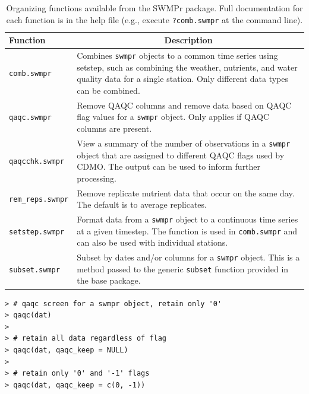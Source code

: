 \documentclass[10pt,letterpaper]{article}\usepackage[]{graphicx}\usepackage[]{color}
\makeatletter
\newenvironment{kframe}{%
 \def\at@end@of@kframe{}%
 \ifinner\ifhmode%
  \def\at@end@of@kframe{\end{minipage}}%
  \begin{minipage}{\columnwidth}%
 \fi\fi%
 \def\FrameCommand##1{\hskip\@totalleftmargin \hskip-\fboxsep
 \colorbox{shadecolor}{##1}\hskip-\fboxsep
     \hskip-\linewidth \hskip-\@totalleftmargin \hskip\columnwidth}%
 \MakeFramed {\advance\hsize-\width
   \@totalleftmargin\z@ \linewidth\hsize
   \@setminipage}}%
 {\par\unskip\endMakeFramed%
 \at@end@of@kframe}
\newenvironment{knitrout}{}{} %
\makeatother
\begin{document}
\begin{table}[!tbp]
\caption{Organizing functions available from the SWMPr package. Full documentation for each function is in the help file (e.g., execute \texttt{?comb.swmpr} at the command line).\label{tab:organize}} 
\begin{center}
\begin{tabular}{lp{3.5in}}
\hline\hline
\multicolumn{1}{l}{Function}&\multicolumn{1}{c}{Description}\tabularnewline
\hline
\texttt{comb.swmpr}&Combines \texttt{swmpr} objects to a common time series using setstep, such as combining the weather, nutrients, and water quality data for a single station. Only different data types can be combined.\tabularnewline
\texttt{qaqc.swmpr}&Remove \ac{QAQC} columns and remove data based on \ac{QAQC} flag values for a \texttt{swmpr} object.  Only applies if \ac{QAQC} columns are present. \tabularnewline
\texttt{qaqcchk.swmpr}&View a summary of the number of observations in a \texttt{swmpr} object that are assigned to different \ac{QAQC} flags used by \ac{CDMO}.  The output can be used to inform further processing.\tabularnewline
\texttt{rem\_reps.swmpr}&Remove replicate nutrient data that occur on the same day.  The default is to average replicates.\tabularnewline
\texttt{setstep.swmpr}&Format data from a \texttt{swmpr} object to a continuous time series at a given timestep.  The function is used in \texttt{comb.swmpr} and can also be used with individual stations.\tabularnewline
\texttt{subset.swmpr}&Subset by dates and/or columns for a \texttt{swmpr} object.  This is a method passed to the generic \texttt{subset} function provided in the base package.\tabularnewline
\hline
\end{tabular}\end{center}

\end{table}


\begin{knitrout}\small
{}\color{fgcolor}\begin{kframe}
\begin{verbatim}
> # qaqc screen for a swmpr object, retain only '0'
> qaqc(dat)
> 
> # retain all data regardless of flag
> qaqc(dat, qaqc_keep = NULL)
> 
> # retain only '0' and '-1' flags
> qaqc(dat, qaqc_keep = c(0, -1))
\end{verbatim}
\end{kframe}
\end{knitrout}
\end{document}
